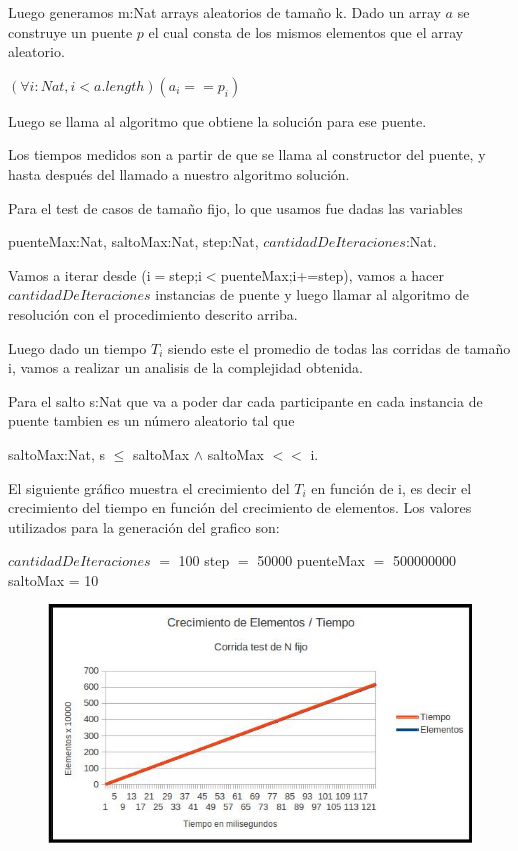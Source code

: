 Luego generamos m:Nat arrays aleatorios de tamaño k. Dado un array $a$ se construye un puente $p$ el cual consta de los mismos elementos que el array aleatorio. 

$(\forall i:Nat, i < a.length)(a_{i} == p_{i})$

Luego se llama al algoritmo que obtiene la soluci\'on para ese puente.

Los tiempos medidos son a partir de que se llama al constructor del puente, y hasta despu\'es del llamado a nuestro algoritmo soluci\'on.

Para el test de casos de tamaño fijo, lo que usamos fue dadas las variables 

puenteMax:Nat, saltoMax:Nat, step:Nat, $cantidadDeIteraciones$:Nat. 

Vamos a iterar desde (i$=$step;i$<$puenteMax;i+=step), vamos a hacer $cantidadDeIteraciones$ instancias de puente y luego llamar al algoritmo de resoluci\'on con el procedimiento descrito arriba.

Luego dado un tiempo $T_{i}$ siendo este el promedio de todas las corridas de tamaño i, vamos a realizar un analisis de la complejidad obtenida.

Para el salto s:Nat que va a poder dar cada participante en cada instancia de puente tambien es un n\'umero aleatorio tal que

saltoMax:Nat, s $\leq$ saltoMax $\wedge$ saltoMax $<<$ i.

El siguiente gr\'afico muestra el crecimiento del $T_{i}$ en funci\'on de i, es decir el crecimiento del tiempo en funci\'on del crecimiento de elementos.
Los valores utilizados para la generaci\'on del grafico son:

\newpage

$cantidadDeIteraciones$ $=$ 100 step $=$ 50000 puenteMax $=$ 500000000 saltoMax = 10

\begin{figure}[ht]
	\begin{minipage}[t]{\linewidth}
		\centering
		\includegraphics[width=\textwidth]{grafico_de_n_fijo.jpg}
	\end{minipage}	
\end{figure}

